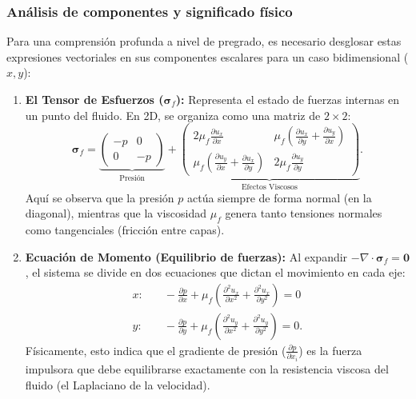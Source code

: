\documentclass[12pt, letterpaper]{report}
\theoremstyle{definition}
\begin{document}
\subsubsection{Análisis de componentes y significado físico}

Para una comprensión profunda a nivel de pregrado, es necesario desglosar estas expresiones vectoriales en sus componentes escalares para un caso bidimensional ($x, y$):

\begin{enumerate}
    \item \textbf{El Tensor de Esfuerzos ($\boldsymbol{\sigma}_f$):} Representa el estado de fuerzas internas en un punto del fluido. En 2D, se organiza como una matriz de $2 \times 2$:
    \begin{equation}
        \boldsymbol{\sigma}_f = \underbrace{\begin{pmatrix} -p & 0 \\ 0 & -p \end{pmatrix}}_{\text{Presión}} + \underbrace{\begin{pmatrix} 2\mu_f \frac{\partial u_x}{\partial x} & \mu_f \left( \frac{\partial u_x}{\partial y} + \frac{\partial u_y}{\partial x} \right) \\ \mu_f \left( \frac{\partial u_y}{\partial x} + \frac{\partial u_x}{\partial y} \right) & 2\mu_f \frac{\partial u_y}{\partial y} \end{pmatrix}}_{\text{Efectos Viscosos}}.
    \end{equation}
    Aquí se observa que la presión $p$ actúa siempre de forma normal (en la diagonal), mientras que la viscosidad $\mu_f$ genera tanto tensiones normales como tangenciales (fricción entre capas).
    
    \item \textbf{Ecuación de Momento (Equilibrio de fuerzas):} Al expandir $-\nabla \cdot \boldsymbol{\sigma}_f = \mathbf{0}$, el sistema se divide en dos ecuaciones que dictan el movimiento en cada eje:
    \begin{align}
        x: & \quad -\frac{\partial p}{\partial x} + \mu_f \left( \frac{\partial^2 u_x}{\partial x^2} + \frac{\partial^2 u_x}{\partial y^2} \right) = 0 \\
        y: & \quad -\frac{\partial p}{\partial y} + \mu_f \left( \frac{\partial^2 u_y}{\partial x^2} + \frac{\partial^2 u_y}{\partial y^2} \right) = 0.
    \end{align}
    Físicamente, esto indica que el gradiente de presión ($\frac{\partial p}{\partial x_i}$) es la fuerza impulsora que debe equilibrarse exactamente con la resistencia viscosa del fluido (el Laplaciano de la velocidad).
    

\end{enumerate}
\end{document}
